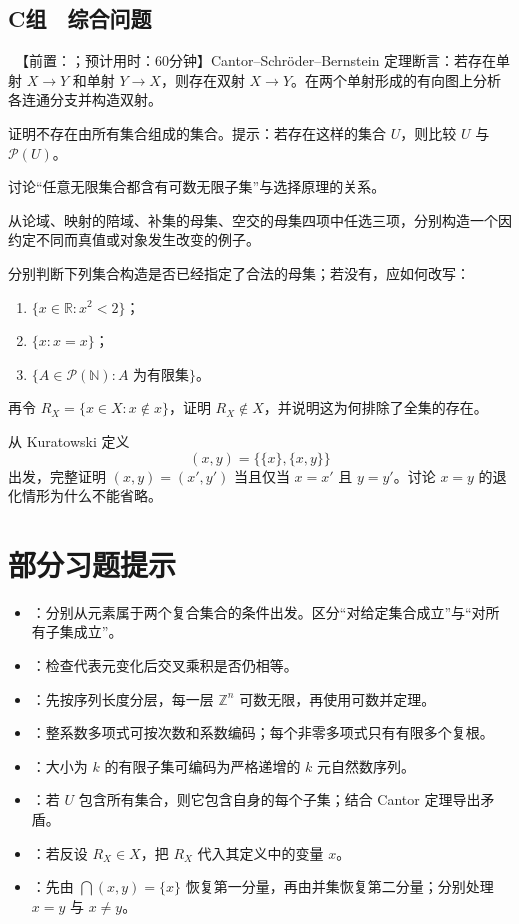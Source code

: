 \subsection*{C组　综合问题}
\begin{enumerate}[label=\textbf{\thechapter.\arabic*.},resume]
   \ 【前置：；预计用时：60分钟】Cantor--Schröder--Bernstein 定理断言：若存在单射 \(X\to Y\) 和单射 \(Y\to X\)，则存在双射 \(X\to Y\)。在两个单射形成的有向图上分析各连通分支并构造双射。

   证明不存在由所有集合组成的集合。提示：若存在这样的集合 \(U\)，则比较 \(U\) 与 \(\mathcal P(U)\)。

   讨论“任意无限集合都含有可数无限子集”与选择原理的关系。

   从论域、映射的陪域、补集的母集、空交的母集四项中任选三项，分别构造一个因约定不同而真值或对象发生改变的例子。

   分别判断下列集合构造是否已经指定了合法的母集；若没有，应如何改写：
  \begin{enumerate}[label=(\arabic*)]
    \item \(\{x\in\mathbb R:x^2<2\}\)；
    \item \(\{x:x=x\}\)；
    \item \(\{A\in\mathcal P(\mathbb N):A\text{ 为有限集}\}\)。
  \end{enumerate}
  再令 \(R_X=\{x\in X:x\notin x\}\)，证明 \(R_X\notin X\)，并说明这为何排除了全集的存在。

   从 Kuratowski 定义
  \[
    (x,y)=\bigl\{\{x\},\{x,y\}\bigr\}
  \]
  出发，完整证明 \((x,y)=(x',y')\) 当且仅当 \(x=x'\) 且 \(y=y'\)。讨论 \(x=y\) 的退化情形为什么不能省略。
\end{enumerate}

\section*{部分习题提示}
\begin{itemize}
  \item {}：分别从元素属于两个复合集合的条件出发。区分“对给定集合成立”与“对所有子集成立”。
  \item {}：检查代表元变化后交叉乘积是否仍相等。
\item {}：先按序列长度分层，每一层 \(\mathbb Z^n\) 可数无限，再使用可数并定理。
  \item {}：整系数多项式可按次数和系数编码；每个非零多项式只有有限多个复根。
  \item {}：大小为 \(k\) 的有限子集可编码为严格递增的 \(k\) 元自然数序列。
  \item {}：若 \(U\) 包含所有集合，则它包含自身的每个子集；结合 Cantor 定理导出矛盾。
  \item {}：若反设 \(R_X\in X\)，把 \(R_X\) 代入其定义中的变量 \(x\)。
  \item {}：先由 \(\bigcap(x,y)=\{x\}\) 恢复第一分量，再由并集恢复第二分量；分别处理 \(x=y\) 与 \(x\ne y\)。
\end{itemize}
